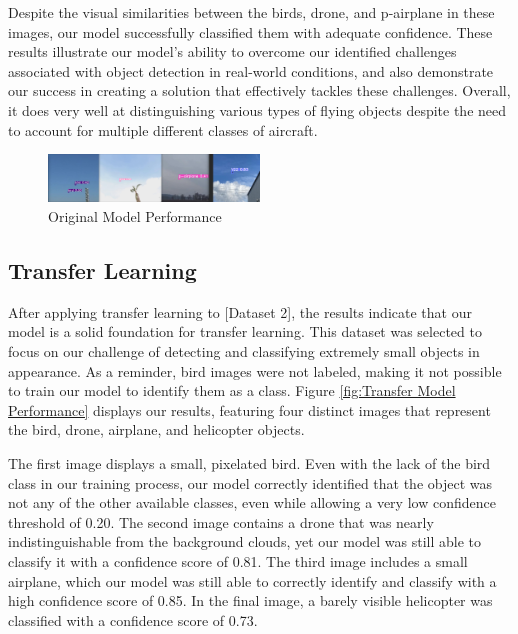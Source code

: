 \documentclass[10pt,twocolumn,letterpaper]{article}
\begin{document}
Despite the visual similarities between the birds, drone, and p-airplane in these images, our model successfully classified them with adequate confidence. These results illustrate our model's ability to overcome our identified challenges associated with object detection in real-world conditions, and also demonstrate our success in creating a solution that effectively tackles these challenges. Overall, it does very well at distinguishing various types of flying objects despite the need to account for multiple different classes of aircraft.

\begin{figure}[h]
    \centering
    \includegraphics[width=0.5\textwidth]{figures/original_model.png}
    \caption{Original Model Performance \cite{Yolov5Arch}}
    \label{fig:Original Model Performance}
\end{figure}

\subsection{Transfer Learning}

After applying transfer learning to [Dataset 2], the results indicate that our model is a solid foundation for transfer learning. This dataset was selected to focus on our challenge of detecting and classifying extremely small objects in appearance. As a reminder, bird images were not labeled, making it not possible to train our model to identify them as a class. Figure \ref{fig:Transfer Model Performance} displays our results, featuring four distinct images that represent the bird, drone, airplane, and helicopter objects.

The first image displays a small, pixelated bird. Even with the lack of the bird class in our training process, our model correctly identified that the object was not any of the other available classes, even while allowing a very low confidence threshold of 0.20. The second image contains a drone that was nearly indistinguishable from the background clouds, yet our model was still able to classify it with a confidence score of 0.81. The third image includes a small airplane, which our model was still able to correctly identify and classify with a high confidence score of 0.85. In the final image, a barely visible helicopter was classified with a confidence score of 0.73.
\end{document}
